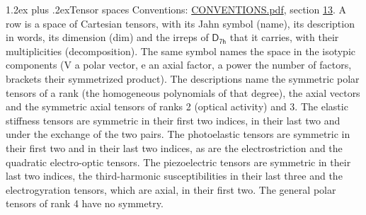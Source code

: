 \documentclass[10pt,a4paper]{article}
\makeatletter
\renewcommand\section{\@startsection{section}{1}{\z@}{-3ex plus -1ex minus -.2ex}%
  {1.2ex plus .2ex}{\normalfont\large\sffamily\bfseries\color{parttitle}}}
\numberwithin{equation}{section}
\newcommand{\grp}[1]{\mathsf{#1}}
\makeatother
\begin{document}
\section{Tensor spaces}\label{s:tensor_spaces}
Conventions: \href{../../CONVENTIONS.pdf}{CONVENTIONS.pdf}, section \href{../../CONVENTIONS.pdf\#conv.13}{13}.
\leavevmode\label{n:head.name}\label{n:head.description}\label{n:head.dim}\label{n:head.decomposition}A row is a space of Cartesian tensors, with its Jahn symbol (name), its description in words, its dimension (dim) and the irreps of $\grp{D_{7h}}$ that it carries, with their multiplicities (decomposition). \label{n:label.jahn}The same symbol names the space in the isotypic components (V a polar vector, e an axial factor, a power the number of factors, brackets their symmetrized product). The descriptions name the symmetric polar tensors of a rank (the homogeneous polynomials of that degree), the axial vectors and the symmetric axial tensors of ranks 2 (optical activity) and 3. The elastic stiffness tensors are symmetric in their first two indices, in their last two and under the exchange of the two pairs. The photoelastic tensors are symmetric in their first two and in their last two indices, as are the electrostriction and the quadratic electro-optic tensors. The piezoelectric tensors are symmetric in their last two indices, the third-harmonic susceptibilities in their last three and the electrogyration tensors, which are axial, in their first two. The general polar tensors of rank 4 have no symmetry.
\end{document}
